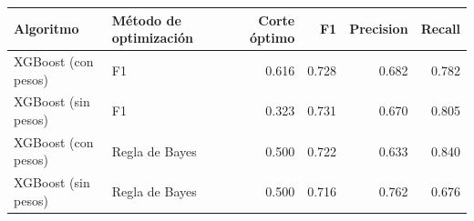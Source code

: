 
\centering
\begin{tabular}[t]{llrrrr}
\toprule
Algoritmo & Método de optimización & Corte óptimo & F1 & Precision & Recall\\
\midrule
XGBoost (con pesos) & F1 & 0.616 & 0.728 & 0.682 & 0.782\\
XGBoost (sin pesos) & F1 & 0.323 & 0.731 & 0.670 & 0.805\\
XGBoost (con pesos) & Regla de Bayes & 0.500 & 0.722 & 0.633 & 0.840\\
XGBoost (sin pesos) & Regla de Bayes & 0.500 & 0.716 & 0.762 & 0.676\\
\bottomrule
\end{tabular}

